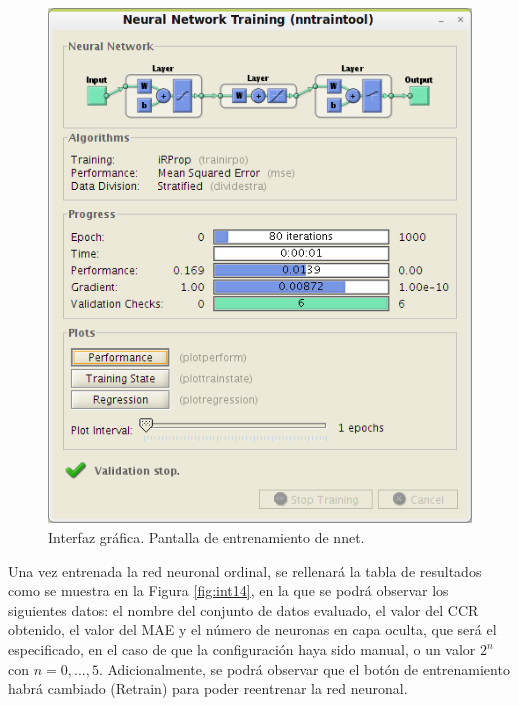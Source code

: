 		\begin{figure}[htbp]
			\centering
			\includegraphics[scale=0.8]{interfaz/interface13-3.png}
			\caption{Interfaz gráfica. Pantalla de entrenamiento de nnet.}
			\label{fig:int13-3}
		\end{figure}
		
		Una vez entrenada la red neuronal ordinal, se rellenará la tabla de resultados como se muestra en la Figura \ref{fig:int14}, en la que se podrá observar los siguientes datos: el nombre del conjunto de datos evaluado, el valor del CCR obtenido, el valor del MAE y el número de neuronas en capa oculta, que será el especificado, en el caso de que la configuración haya sido manual, o un valor $2^n$ con $n = 0,...,5$. Adicionalmente, se podrá observar que el botón de entrenamiento habrá cambiado (Retrain) para poder reentrenar la red neuronal.\\
		
